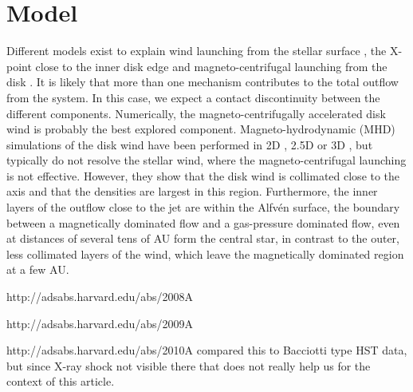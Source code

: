 \section{Model}
Different models exist to explain wind launching from the stellar surface \citep{1988ApJ...332L..41K,2005ApJ...632L.135M}, the X-point close to the inner disk edge \citep{1994ApJ...429..781S} and magneto-centrifugal launching from the disk \citep{1982MNRAS.199..883B,2005ApJ...630..945A}. It is likely that more than one mechanism contributes to the total outflow from the system. In this case, we expect a contact discontinuity between the different components. Numerically, the magneto-centrifugally accelerated disk wind is probably the best explored component. Magneto-hydrodynamic (MHD) simulations of the disk wind have been performed in 2D \citep{2005ApJ...630..945A}, 2.5D \citep{2011ApJ...728L..11R} or 3D \citep{2006ApJ...653L..33A}, but typically do not resolve the stellar wind, where the magneto-centrifugal launching is not effective. However, they show that the disk wind is collimated close to the axis and that the densities are largest in this region. Furthermore, the inner layers of the outflow close to the jet are within the Alfv\'en surface, the boundary between a magnetically dominated flow and a gas-pressure dominated flow, even at distances of several tens of AU form the central star, in contrast to the outer, less collimated layers of the wind, which leave the magnetically dominated region at a few AU.

http://adsabs.harvard.edu/abs/2008A%

http://adsabs.harvard.edu/abs/2009A%

http://adsabs.harvard.edu/abs/2010A%
compared this to Bacciotti type HST data, but since X-ray shock not visible there that does not really help us for the context of this article.
